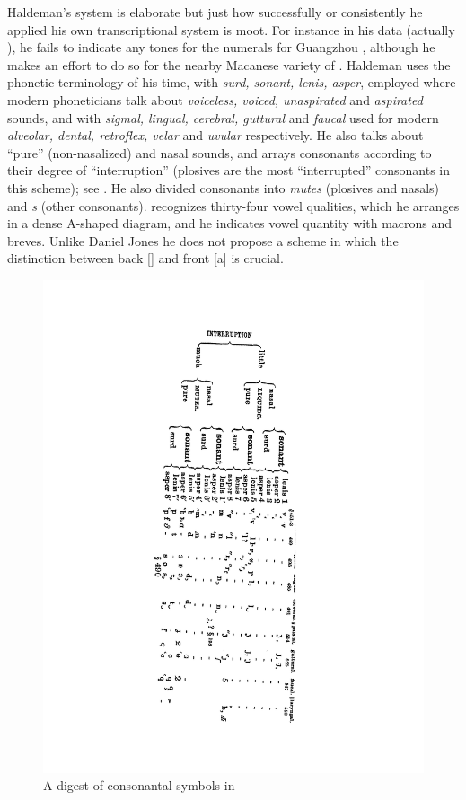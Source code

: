 \documentclass[output=paper]{LSP/langsci}
\begin{document}
Haldeman's system is elaborate but just how successfully or consistently he applied his own transcriptional system is moot. For instance in his  data (actually ), he fails to indicate any tones for the numerals for Guangzhou , although he makes an effort to do so for  the nearby Macanese variety of .  Haldeman uses the phonetic terminology of his time, with \textit{surd, sonant, lenis, asper}, employed where modern phoneticians talk about \textit{voiceless, voiced, unaspirated} and \textit{aspirated} sounds, and with \textit{sigmal, lingual, cerebral, guttural} and \textit{faucal} used for modern \textit{alveolar, dental, retroflex, velar} and \textit{uvular} respectively. He also talks about ``pure'' (non-nasalized) and  nasal  sounds, and arrays consonants according to their degree of ``interruption'' (plosives are the most ``interrupted'' consonants in this scheme); see . He also divided consonants into \textit{mutes} (plosives and nasals) and \textit{s} (other consonants).  \citet[83, 369]{Haldeman1860} recognizes thirty-four vowel qualities, which he arranges in a dense A-shaped diagram, and he indicates vowel quantity with macrons and breves. Unlike Daniel Jones \citeyearpar{Jones1909} he does not propose a scheme in which the distinction between back [] and front [a] is crucial.  

\begin{figure} 
\caption{A digest of consonantal symbols in \citealt[121: \S576]{Haldeman1860}} \label{haldemandigest}

\includegraphics[width=.6\textwidth,angle=90]{figures/GrantConsonants}
\end{figure}
\end{document}
